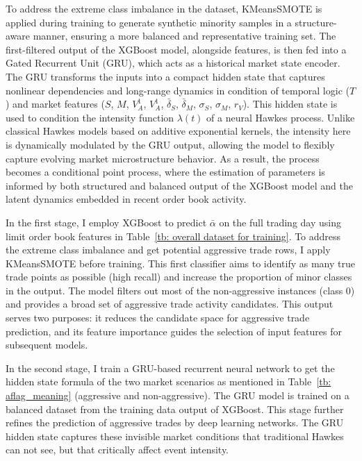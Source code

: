 To address the extreme class imbalance in the dataset, KMeansSMOTE is applied during training to generate synthetic minority samples in a structure-aware manner, ensuring a more balanced and representative training set. The first-filtered output of the XGBoost model, alongside features, is then fed into a Gated Recurrent Unit (GRU), which acts as a historical market state encoder. The GRU transforms the inputs into a compact hidden state that captures nonlinear dependencies and long-range dynamics in condition of temporal logic ($T$) and market features ($S$, $M$, $V_A^{1}$, $V_A^{1}$, $\bar{\delta}_S$, $\bar{\delta}_M$, $\sigma_S$, $\sigma_M$, $r_V$). This hidden state is used to condition the intensity function $\lambda(t)$ of a neural Hawkes process. Unlike classical Hawkes models based on additive exponential kernels, the intensity here is dynamically modulated by the GRU output, allowing the model to flexibly capture evolving market microstructure behavior. As a result, the process becomes a conditional point process, where the estimation of parameters is informed by both structured and balanced output of the XGBoost model and the latent dynamics embedded in recent order book activity.

In the first stage, I employ XGBoost to predict $\bar{\alpha}$ on the full trading day using limit order book features in Table~\ref{tb: overall dataset for training}. To address the extreme class imbalance and get potential aggressive trade rows, I apply KMeansSMOTE before training. This first classifier aims to identify as many true trade points as possible (high recall) and increase the proportion of minor classes in the output. The model filters out most of the non-aggressive instances (class 0) and provides a broad set of aggressive trade activity candidates. This output serves two purposes: it reduces the candidate space for aggressive trade prediction, and its feature importance guides the selection of input features for subsequent models.

In the second stage, I train a GRU-based recurrent neural network to get the hidden state formula of the two market scenarios as mentioned in Table~\ref{tb: aflag_meaning} (aggressive and non-aggressive). The GRU model is trained on a balanced dataset from the training data output of XGBoost. This stage further refines the prediction of aggressive trades by deep learning networks. The GRU hidden state captures these invisible market conditions that traditional Hawkes can not see, but that critically affect event intensity.

